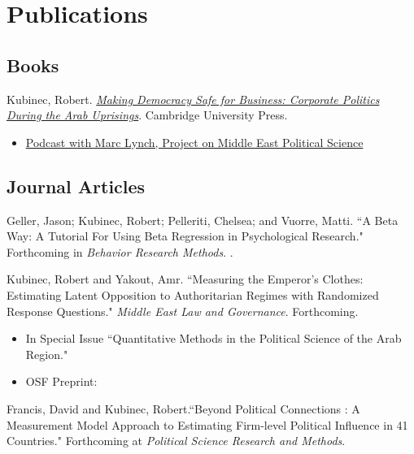 \documentclass[11pt, a4paper]{article}
\newcommand{\years}[1]{\marginnote{\scriptsize #1}}
\begin{document}
\section*{Publications}

\subsection*{Books}

\years{2023} Kubinec, Robert. \emph{\href{https://www.cambridge.org/gb/academic/subjects/politics-international-relations/political-economy/making-democracy-safe-business-corporate-politics-during-arab-uprisings?format=HB}{Making Democracy Safe for Business: Corporate Politics During the Arab Uprisings}}. Cambridge University Press.

\begin{itemize}
	\item \href{https://pomeps.org/making-democracy-safe-for-business-apsa-virtual-posters-s-13-ep-1}{Podcast with Marc Lynch, Project on Middle East Political Science}
\end{itemize}

 \newpage
 
\subsection*{Journal Articles}

\years{2026} Geller, Jason; Kubinec, Robert; Pelleriti, Chelsea; and Vuorre, Matti. ``A Beta Way: A Tutorial For Using Beta Regression in Psychological Research." Forthcoming in \emph{Behavior Research Methods}. .

\years{2026} Kubinec, Robert and Yakout, Amr. ``Measuring the Emperor's Clothes: Estimating Latent Opposition to Authoritarian Regimes with Randomized Response Questions." \emph{Middle East Law and Governance}. Forthcoming. 

\begin{itemize}
	\item In Special Issue ``Quantitative Methods in the Political Science of the Arab Region."
	\item OSF Preprint: 
\end{itemize}

\years{2025}  Francis, David and Kubinec, Robert.``Beyond Political Connections : A Measurement Model Approach to Estimating Firm-level Political Influence in 41 Countries." Forthcoming at \emph{Political Science Research and Methods}. \\
\end{document}
